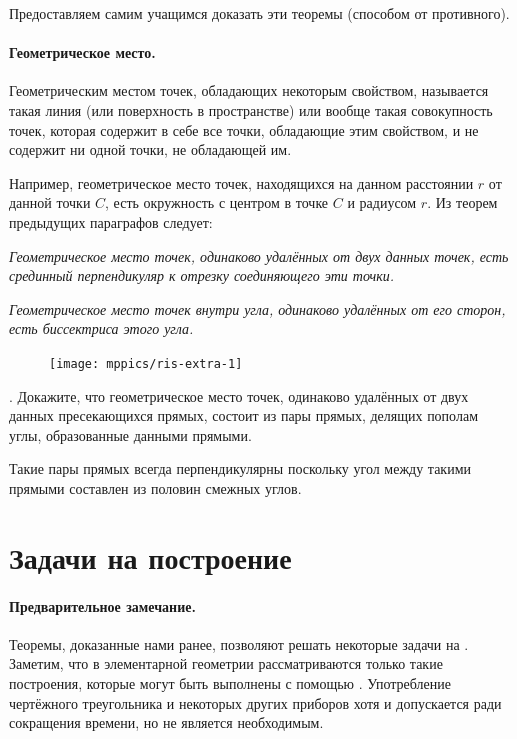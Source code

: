 \documentclass[twoside]{book}
\begin{document}
\medskip

Предоставляем самим учащимся доказать эти теоремы (способом от противного).

\paragraph{Геометрическое место.}\label{1938/60}
Геометрическим местом точек, обладающих некоторым свойством, называется такая линия (или поверхность в пространстве) или вообще такая совокупность точек, которая содержит в себе все точки, обладающие этим свойством, и не содержит ни одной точки, не обладающей им.

Например, геометрическое место точек, находящихся на данном расстоянии $r$ от данной точки $C$, есть окружность с центром в точке $C$ и радиусом $r$.
Из теорем предыдущих параграфов следует:

\emph{Геометрическое место точек, одинаково удалённых от двух данных точек, есть срединный перпендикуляр к отрезку соединяющего эти точки.} 

\emph{Геометрическое место точек внутри угла, одинаково удалённых от его сторон, есть биссектриса этого угла.}

\begin{figure}
\centering
\texttt{[image: mppics/ris-extra-1]}
\caption{}\label{extra/1}
\end{figure}

\smallskip
\mbox{.} Докажите, что геометрическое место точек, одинаково удалённых от двух данных пресекающихся прямых, состоит из пары прямых, делящих пополам углы, образованные данными прямыми.

Такие пары прямых всегда перпендикулярны поскольку угол между такими прямыми составлен из половин смежных углов.

\section{Задачи на построение}

\paragraph{Предварительное замечание.}\label{1938/61}
Теоремы, доказанные нами ранее, позволяют решать некоторые задачи на .
Заметим, что в элементарной геометрии рассматриваются только такие построения, которые могут быть выполнены с помощью .
Употребление чертёжного треугольника и некоторых других приборов хотя и допускается ради сокращения времени, но не является необходимым.
\end{document}
